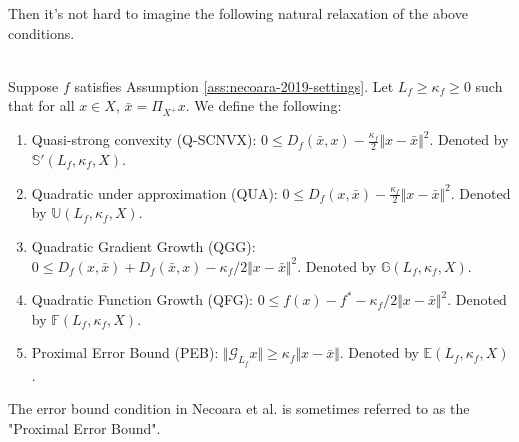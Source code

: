 \documentclass[12pt]{report}
\begin{document}
            Then it's not hard to imagine the following natural relaxation of the above conditions. 
            \begin{definition}\;\\
                Suppose $f$ satisfies Assumption \ref{ass:necoara-2019-settings}.
                \label{def:necoara-weaker-scnvx}
                Let $L_f \ge \kappa_f \ge 0$ such that for all $x \in X$, $\bar x = \Pi_{X^+} x$. 
                We define the following: 
                \begin{enumerate}
                    \item\label{def:neocara-qscnvx} Quasi-strong convexity (Q-SCNVX): $0 \le D_f(\bar x, x) - \frac{\kappa_f}{2}\Vert x - \bar x\Vert^2$. 
                    Denoted by $\mathbb S'(L_f, \kappa_f, X)$. 
                    \item\label{def:necoara-qup} Quadratic under approximation (QUA): $0 \le D_f(x, \bar x) - \frac{\kappa_f}{2}\Vert x - \bar x\Vert^2$. 
                    Denoted by $\mathbb U(L_f, \kappa_f, X)$. 
                    \item\label{def:necoara-qgg} Quadratic Gradient Growth (QGG): $0\le D_f(x, \bar x) + D_f(\bar x, x) - \kappa_f/2\Vert x - \bar x\Vert^2$. 
                    Denoted by $\mathbb G(L_f, \kappa_f, X)$. 
                    \item\label{def:necoara-qfg} Quadratic Function Growth (QFG): $0 \le f(x) - f^* - \kappa_f/2\Vert x - \bar x\Vert^2$. 
                    Denoted by $\mathbb F(L_f, \kappa_f, X)$. 
                    \item\label{def:necoara-peb} Proximal Error Bound (PEB): $\Vert \mathcal G_{L_f}x\Vert \ge \kappa_f\Vert x - \bar x\Vert$. 
                    Denoted by $\mathbb E(L_f, \kappa_f, X)$. 
                \end{enumerate}
            \end{definition}
            \begin{remark}
                The error bound condition in Necoara et al. is sometimes referred to as the "Proximal Error Bound". 
            \end{remark}
\end{document}

